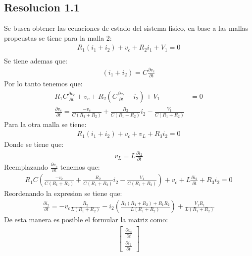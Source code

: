 \documentclass[
  11pt,
  letterpaper,
   addpoints,
   answers
  ]{exam}
\begin{document}
\begin{questions}
\begin{solution}
    \subsection*{Resolucion 1.1}
    Se busca obtener las ecuaciones de estado del sistema fisico, en base a las mallas propeustas se tiene para la malla 2:
    \begin{align}
        R_{1}(i_{1} + i_{2}) + v_{c} + R_{2}i_{1} + V_{1}=0\\
    \end{align}
    Se tiene ademas que:
    \begin{align}
        (i_{1} + i_{2}) = C \frac{\partial v_{c}}{\partial t}
    \end{align}
    Por lo tanto tenemos que:
    \begin{align}
        R_{1} C \frac{\partial v_{c}}{\partial t} + v_{c} + R_{2}\left( C \frac{\partial v_{c}}{\partial t} - i_{2}\right) + V_{1}&=0\\
        \frac{\partial v_{c}}{\partial t} = \frac{-v_{c}}{C(R_{1}+R_{2})} + \frac{R_{2}}{C(R_{1}+ R_{2})}i_{2} - \frac{V_{1}}{C(R_{1}+R_{2})}
    \end{align} 
    Para la otra malla se tiene: 
    \begin{align}
        R_{1}(i_{1} + i_{2}) + v_{c} + v_{L} + R_{3}i_{2} = 0
    \end{align}
    Donde se tiene que:
    \begin{align}
        v_{L} = L \frac{\partial i_{2}}{\partial t} 
    \end{align}
    Reemplazando $\frac{\partial v_{c}}{\partial t}$ tenemos que:
    \begin{align}
        R_{1} C \left( \frac{-v_{c}}{C(R_{1}+R_{2})} + \frac{R_{2}}{C(R_{1}+ R_{2})}i_{2} - \frac{V_{1}}{C(R_{1}+R_{2})}\right)+ v_{c} + L \frac{\partial i_{2}}{\partial t} + R_{3}i_{2} = 0
    \end{align} 
    Reordenando la expresion se tiene que:
    \begin{align}
        \frac{\partial i_{2}}{\partial t} = -v_{c} \frac{R_{2}}{L(R_{1}+ R_{2})} - i_{2}\left(\frac{R_{3}(R_{1}+R_{2}) + R_{1}R_{2}}{L(R_{1}+R_{2})}\right) + \frac{V_{1}R_{1}}{L(R_{1}+R_{2})} 
    \end{align}
    De esta manera es posible el formular la matriz como:
    \begin{align}
        \begin{bmatrix}
        \frac{\partial v_{c}}{\partial t} \\
        \frac{\partial i_{2}}{\partial t}

\end{bmatrix}
\end{align}
\end{solution}
\end{questions}
\end{document}
